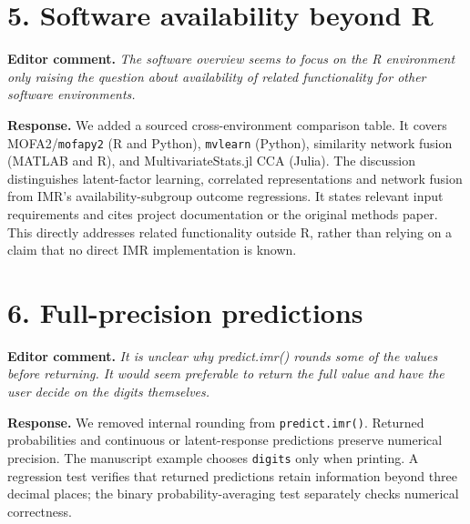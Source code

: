 \documentclass[11pt]{article}
\newcommand{\pkg}[1]{\textsf{#1}}
\newcommand{\code}[1]{\texttt{#1}}
\newenvironment{editorcomment}
  {\par\smallskip\sloppy\noindent\textbf{Editor comment.}\itshape}
  {\par\smallskip\fussy}
\newenvironment{response}
  {\noindent\textbf{Response.}}
  {\par\smallskip}
\begin{document}
\section*{5. Software availability beyond R}
\begin{editorcomment}
The software overview seems to focus on the R environment only raising the
question about availability of related functionality for other software
environments.
\end{editorcomment}
\begin{response}
We added a sourced cross-environment comparison table. It covers
MOFA2/\code{mofapy2} (R and Python), \code{mvlearn} (Python), similarity
network fusion (MATLAB and R), and \pkg{MultivariateStats.jl} CCA (Julia).
The discussion distinguishes latent-factor learning, correlated representations
and network fusion from IMR's availability-subgroup outcome regressions. It
states relevant input requirements and cites project documentation or the
original methods paper. This directly addresses related functionality outside
R, rather than relying on a claim that no direct IMR implementation is known.
\end{response}

\section*{6. Full-precision predictions}
\begin{editorcomment}
It is unclear why predict.imr() rounds some of the values before returning. It
would seem preferable to return the full value and have the user decide on the
digits themselves.
\end{editorcomment}
\begin{response}
We removed internal rounding from \code{predict.imr()}. Returned probabilities
and continuous or latent-response predictions preserve numerical precision.
The manuscript example chooses \code{digits} only when printing. A regression
test verifies that returned predictions retain information beyond three decimal
places; the binary probability-averaging test separately checks numerical
correctness.
\end{response}
\end{document}
